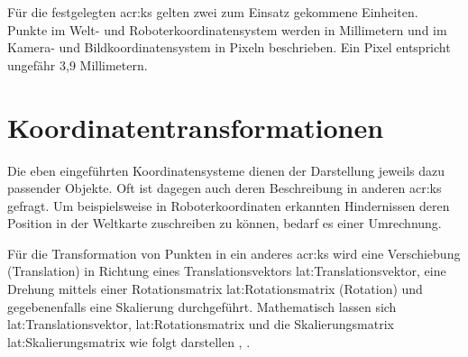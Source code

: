 
Für die festgelegten \gls{acr:ks} gelten zwei zum Einsatz gekommene Einheiten. Punkte im Welt- und Roboterkoordinatensystem werden in Millimetern und im Kamera- und Bildkoordinatensystem in Pixeln beschrieben. Ein Pixel entspricht ungefähr 3,9 Millimetern.

\section{Koordinatentransformationen}

Die eben eingeführten Koordinatensysteme dienen der Darstellung jeweils dazu passender Objekte. Oft ist dagegen auch deren Beschreibung in anderen \gls{acr:ks} gefragt. Um beispielsweise in Roboterkoordinaten erkannten Hindernissen deren Position in der Weltkarte zuschreiben zu können, bedarf es einer Umrechnung. 

Für die Transformation von Punkten in ein anderes \gls{acr:ks} wird eine Verschiebung (Translation) in Richtung eines Translationsvektors \gls{lat:Translationsvektor}, eine Drehung mittels einer Rotationsmatrix \gls{lat:Rotationsmatrix} (Rotation) und gegebenenfalls eine Skalierung durchgeführt.
Mathematisch lassen sich \gls{lat:Translationsvektor}, \gls{lat:Rotationsmatrix} und die Skalierungsmatrix \gls{lat:Skalierungsmatrix} wie folgt darstellen \autocite[S.~26f]{corkeRoboticsVisionControl2017}, \autocite[S.~133]{nischwitzComputergrafik2011}.

